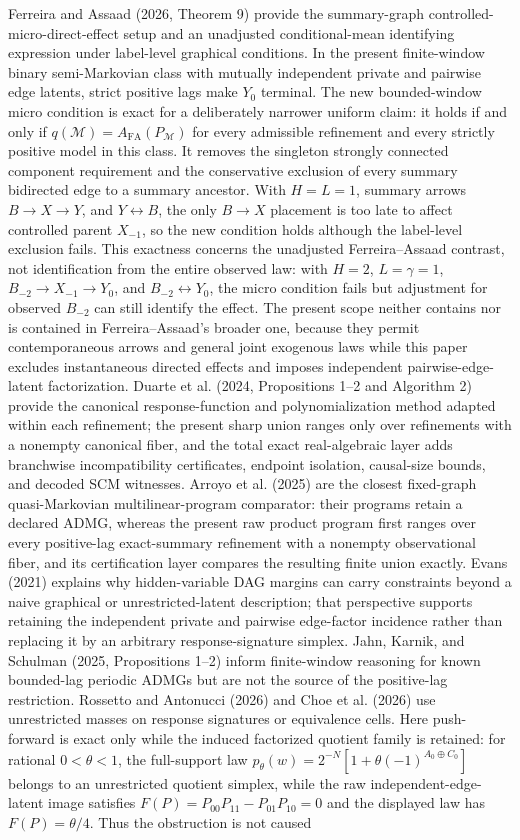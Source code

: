 \documentclass{article}
\begin{document}
Ferreira and Assaad (2026, Theorem 9) provide the summary-graph controlled-micro-direct-effect setup and an unadjusted conditional-mean identifying expression under label-level graphical conditions. In the present finite-window binary semi-Markovian class with mutually independent private and pairwise edge latents, strict positive lags make \(Y_0\) terminal. The new bounded-window micro condition is exact for a deliberately narrower uniform claim: it holds if and only if \(q(\mathcal M)=A_{\mathrm{FA}}(P_{\mathcal M})\) for every admissible refinement and every strictly positive model in this class. It removes the singleton strongly connected component requirement and the conservative exclusion of every summary bidirected edge to a summary ancestor. With \(H=L=1\), summary arrows \(B\to X\to Y\), and \(Y\leftrightarrow B\), the only \(B\to X\) placement is too late to affect controlled parent \(X_{-1}\), so the new condition holds although the label-level exclusion fails. This exactness concerns the unadjusted Ferreira--Assaad contrast, not identification from the entire observed law: with \(H=2\), \(L=\gamma=1\), \(B_{-2}\to X_{-1}\to Y_0\), and \(B_{-2}\leftrightarrow Y_0\), the micro condition fails but adjustment for observed \(B_{-2}\) can still identify the effect. The present scope neither contains nor is contained in Ferreira--Assaad's broader one, because they permit contemporaneous arrows and general joint exogenous laws while this paper excludes instantaneous directed effects and imposes independent pairwise-edge-latent factorization. Duarte et al. (2024, Propositions 1--2 and Algorithm 2) provide the canonical response-function and polynomialization method adapted within each refinement; the present sharp union ranges only over refinements with a nonempty canonical fiber, and the total exact real-algebraic layer adds branchwise incompatibility certificates, endpoint isolation, causal-size bounds, and decoded SCM witnesses. Arroyo et al. (2025) are the closest fixed-graph quasi-Markovian multilinear-program comparator: their programs retain a declared ADMG, whereas the present raw product program first ranges over every positive-lag exact-summary refinement with a nonempty observational fiber, and its certification layer compares the resulting finite union exactly. Evans (2021) explains why hidden-variable DAG margins can carry constraints beyond a naive graphical or unrestricted-latent description; that perspective supports retaining the independent private and pairwise edge-factor incidence rather than replacing it by an arbitrary response-signature simplex. Jahn, Karnik, and Schulman (2025, Propositions 1--2) inform finite-window reasoning for known bounded-lag periodic ADMGs but are not the source of the positive-lag restriction. Rossetto and Antonucci (2026) and Choe et al. (2026) use unrestricted masses on response signatures or equivalence cells. Here push-forward is exact only while the induced factorized quotient family is retained: for rational \(0<\theta<1\), the full-support law \(p_\theta(w)=2^{-N}[1+\theta(-1)^{A_0\mathbin\oplus C_0}]\) belongs to an unrestricted quotient simplex, while the raw independent-edge-latent image satisfies \(F(P)=P_{00}P_{11}-P_{01}P_{10}=0\) and the displayed law has \(F(P)=\theta/4\). Thus the obstruction is not caused 
\end{document}
